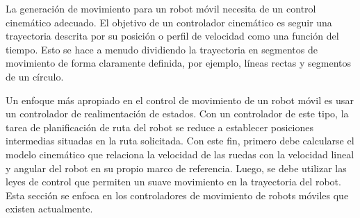 La generación de movimiento para un robot móvil necesita de un control cinemático 
adecuado. El objetivo de un controlador cinemático es seguir una trayectoria descrita 
por su posición o perfil de velocidad como una función del tiempo. Esto se hace 
a menudo dividiendo la trayectoria en segmentos de movimiento de forma claramente 
definida, por ejemplo, líneas rectas y segmentos de un círculo.

Un enfoque más apropiado en el control de movimiento de un robot móvil es usar 
un controlador de realimentación de estados. Con un controlador de este tipo, 
la tarea de planificación de ruta del robot se reduce a establecer posiciones 
intermedias situadas en la ruta solicitada. Con este fin, primero debe calcularse 
el modelo cinemático que relaciona la velocidad de las ruedas con la velocidad 
lineal y angular del robot en su propio marco de referencia. Luego, se debe utilizar las 
leyes de control que permiten un suave movimiento en la trayectoria del robot. Esta
sección se enfoca en los controladores de movimiento de robots móviles que existen actualmente.

